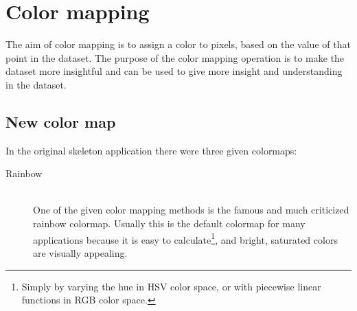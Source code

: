 \section{Color mapping}
	\label{sec:color_mapping}
	The aim of color mapping is to assign a color to pixels, based on the value of that point in the dataset.
	The purpose of the color mapping operation is to make the dataset more insightful and can be used to give more insight and understanding in the dataset.

	\subsection{New color map}
		In the original skeleton application there were three given colormaps:
		\begin{description}
			\item[Rainbow] ~\\
			One of the given color mapping methods is the famous and much criticized\cite{RainbowMisleading}\cite{moreland2009diverging} rainbow colormap.
			Usually this is the default colormap for many applications because it is easy to calculate\footnote{Simply by varying the hue in HSV color space, or with piecewise linear functions in RGB color space.}, and bright, saturated colors are visually appealing.
			\begin{figure}[htb]
				\centering

\end{figure}
\end{description}
